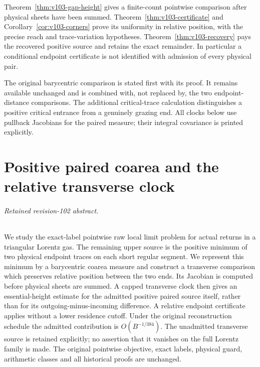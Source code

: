 \documentclass[11pt,reqno]{amsart}
\numberwithin{equation}{section}
\theoremstyle{definition}\newtheorem{definition}[theorem]{Definition}
\theoremstyle{remark}\newtheorem{remark}[theorem]{Remark}
\theoremstyle{definition}\newtheorem{inputstatement}[theorem]{Input statement}
\begin{document}
Theorem~\ref{thm:v103-gap-height} gives a finite-count pointwise
comparison after physical sheets have been summed. Theorem~\ref{thm:v103-certificate}
and Corollary~\ref{cor:v103-corners} prove its uniformity in relative
position, with the precise reach and trace-variation hypotheses.
Theorem~\ref{thm:v103-recovery} pays the recovered positive source
and retains the exact remainder. In particular a conditional endpoint
certificate is not identified with admission of every physical pair.

The original barycentric comparison is stated first with its proof.
It remains available unchanged and is combined with, not replaced by,
the two endpoint-distance comparisons. The additional critical-trace
calculation distinguishes a positive critical entrance from a genuinely
grazing end. All clocks below use pullback Jacobians for the paired
measure; their integral covariance is printed explicitly.









\appendix


\endgroup
\part{Positive paired coarea and the relative transverse clock}
\begingroup
\let\ArchiveLabel\label
\let\ArchiveRef\ref
\renewcommand{\label}[1]{\ArchiveLabel{v102archive:#1}}
\renewcommand{\ref}[1]{%
  \IfBeginWith{#1}{supp-}{%
    \StrBehind{#1}{supp-}[\ArchiveTarget]%
    \ArchiveRef{\ArchiveTarget}%
  }{\ArchiveRef{v102archive:#1}}%
}
\makeatletter
\let\ltx@label\label
\makeatother
\paragraph{Retained revision-102 abstract.}

We study the exact-label pointwise raw local limit problem for actual
returns in a triangular Lorentz gas. The remaining upper source is
the positive minimum of two physical endpoint traces on each short
regular segment. We represent this minimum by a barycentric coarea
measure and construct a transverse comparison which preserves relative
position between the two ends. Its Jacobian is computed before
physical sheets are summed. A capped transverse clock then gives an
essential-height estimate for the admitted positive paired source
itself, rather than for its outgoing-minus-incoming difference.
A relative endpoint certificate applies without a lower residence
cutoff. Under the original reconstruction schedule the admitted
contribution is $O(B^{-1/384})$. The unadmitted transverse source is
retained explicitly; no assertion that it vanishes on the full Lorentz
family is made. The original pointwise objective, exact labels,
physical guard, arithmetic classes and all historical proofs are
unchanged.
\end{document}
